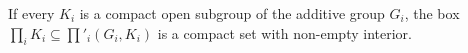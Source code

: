 If every $K_i$ is a compact open subgroup of the additive group $G_i$, the box $\prod_iK_i\subseteq\prod'_i(G_i,K_i)$ is a compact set with non-empty interior.
